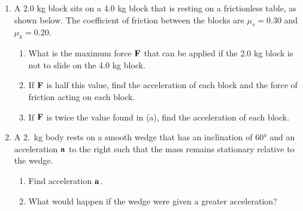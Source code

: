 \documentclass{../../../oss-apphys}
\begin{document}
\begin{enumerate}[leftmargin=15pt]
\item A 2.0 kg block sits on a 4.0 kg block that is resting on a frictionless
  table, as shown below. The coefficient of friction between the blocks are
  $\mu_s=0.30$ and $\mu_k=0.20$.
  \begin{enumerate}[topsep=0pt,itemsep=0pt]
  \item What is the maximum force $\mathbf{F}$ that can be applied if the
    2.0 kg block is not to slide on the 4.0 kg block.
  \item If $\mathbf{F}$ is half this value, find the acceleration of each block and
    the force of friction acting on each block.
  \item If $\mathbf{F}$ is twice the value found in (a), find the acceleration of
    each block.
  \end{enumerate}
  \newpage
  
\item A \SI{2.}{\kilo\gram} body rests on a smooth wedge that has an inclination
  of \ang{60} and an acceleration $\mathbf{a}$ to the right such that the mass
  remains stationary relative to the wedge.
  \begin{enumerate}[noitemsep,topsep=0pt]
  \item Find acceleration $\mathbf{a}$.
  \item What would happen if the wedge were given a greater acceleration?
  \end{enumerate}
  
  \newpage

\end{enumerate}
\end{document}

